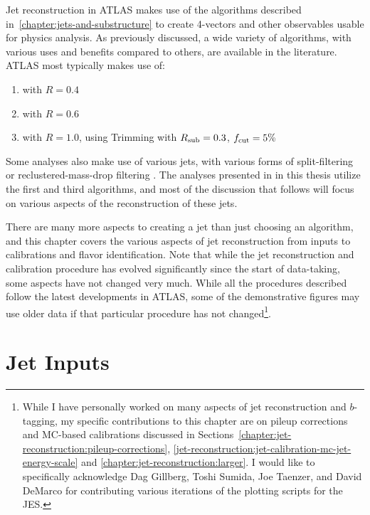 \label{chapter:jet-reconstruction}


Jet reconstruction in ATLAS makes use of the algorithms described in~\ref{chapter:jets-and-substructure} to create 4-vectors and other observables usable for physics analysis. As previously discussed, a wide variety of algorithms, with various uses and benefits compared to others, are available in the literature. ATLAS most typically makes use of:

\begin{enumerate}
	\item \antikt with $R = 0.4$
	\item \antikt with $R = 0.6$
	\item \antikt with $R = 1.0$, using Trimming with $R_{\rm sub} = 0.3$, $f_{\rm cut} = 5\%$
\end{enumerate}
%
Some analyses also make use of various \CAFat jets, with various forms of split-filtering or reclustered-mass-drop filtering . The analyses presented in in this thesis utilize the first and third algorithms, and most of the discussion that follows will focus on various aspects of the reconstruction of these jets.

There are many more aspects to creating a jet than just choosing an algorithm, and this chapter covers the various aspects of jet reconstruction from inputs to calibrations and flavor identification. Note that while the jet reconstruction and calibration procedure has evolved significantly since the start of data-taking, some aspects have not changed very much. While all the procedures described follow the latest developments in ATLAS, some of the demonstrative figures may use older data if that particular procedure has not changed\footnote{While I have personally worked on many aspects of jet reconstruction and $b$-tagging, my specific contributions to this chapter are on pileup corrections and MC-based calibrations discussed in Sections~\ref{chapter:jet-reconstruction:pileup-corrections}, \ref{jet-reconstruction:jet-calibration-mc-jet-energy-scale} and \ref{chapter:jet-reconstruction:larger}. I would like to specifically acknowledge Dag Gillberg, Toshi Sumida, Joe Taenzer, and David DeMarco for contributing various iterations of the plotting scripts for the JES.}.

\section{Jet Inputs}


